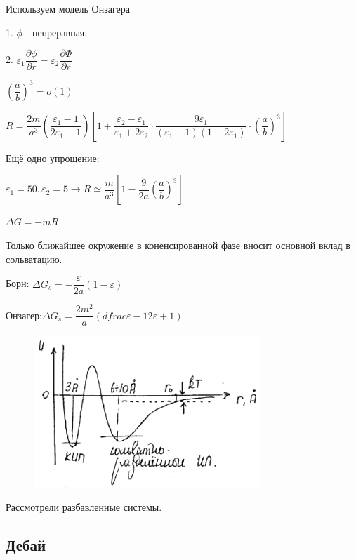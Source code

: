 \begin{lecture}
\begin{lecSection}
\par Используем модель Онзагера
\par 1. $\phi$ - непреравная.
\par 2. $\varepsilon_1 \dfrac{\partial \phi}{\partial r} = \varepsilon_2 \dfrac{\partial \Phi}{\partial r}$
\par $\left(\dfrac{a}{b}\right)^3 = o(1)$
\par $R = \dfrac{2m}{a^3} \left(\dfrac{\varepsilon_1-1}{2 \varepsilon_1 + 1}\right) \left[1 + \dfrac{\varepsilon_2 - \varepsilon_1}{\varepsilon_1 + 2 \varepsilon_2} \cdot \dfrac{9 \varepsilon_1}{(\varepsilon_1 - 1)(1 + 2 \varepsilon_1)} \cdot \left( \dfrac{a}{b}\right)^3 \right]$
\par Ещё одно упрощение:
\par $\varepsilon_1 = 50, \varepsilon_2 = 5 \rightarrow R \simeq \dfrac{m}{a^3} \left[1 - \dfrac{9}{2a} \left(\dfrac{a}{b}\right)^3\right]$
\par $\Delta G = -mR$
\par Только ближайшее окружение в коненсированной фазе вносит основной вклад в сольватацию.

\par Борн: $\Delta G_s = - \dfrac{\varepsilon}{2a}(1-\varepsilon)$
\par Онзагер:$\Delta G_s = \dfrac{2m^2}{a} \left(
dfrac{\varepsilon - 1}{2 \varepsilon + 1}\right)$

	
\begin{figure}[H]
	
	\centering\includegraphics[width=0.6\linewidth]{lecture_09/new_pic7}
	
	\end{figure}
	
	\par Рассмотрели разбавленные системы.
	
\subsection{Дебай}


\end{lecSection}
\end{lecture}
